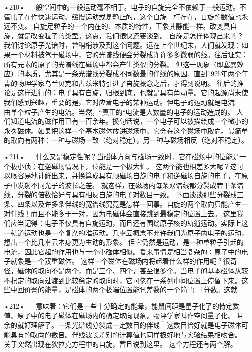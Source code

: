 •210•
  
般空间中的一般运动毫不相于。电子的自旋完全不依赖于一般运动。不管电子在作快速运动、缓慢运动或是静止的，这个自旋一杆存在，自旋的数值也永远不变。
自旋足粒子的一个内在的、本质的特性，正象其静能一样。改变具自旋，就是改变粒子的类型。这点，我们很快还要谈到。
自旋是怎样体现出来的？我们讨论原子光谙时，曾稍梢涉及到这个问题。远在上个世纪末，人们就发现：如果一个材料被驾于磁场中，它的光谱线便会分裂成许许多多微弱的线。往后证实：所有元素的原子的光谱线在磁场中都会产生类似的分裂。
但这一现象（即塞曼效应）的本质，尤其是一条光谱线分裂成不同数最的伴线的原因，直到1925年两个年青的物理学家乌兰贝克和古兹米特引进了自旋概念之后，才得到说明。
往后的推论是这样进行的：电子具有自旋，归根到底，也就是具有角动量。它的起源尚未使我们感到兴趣，重要的是，它对应着电子的某种运动。但电子的运动就是电流——由单个粒子产生的电流。当然，“真正的“电流是大数量的电子的运动造成的。
人们知道电流的磁作用已有一百余年。换句话说，一个电子可以被描绘成一个微小的永久磁体。如果把这样一个基本磁体放进磁场中，它会在这个磁场中取向。最简单的取向有两种：一种与磁场一致（绝对稳定），另一种与磁场相反（绝对不稳定）。

•211•
  
什么又是稳定性呢？当磁体方向与磁场一致时，它在磁炀中的位能是一个极小侦；在逆磁场情况下，位能是一个极大忙。
这两个能也相差多大呢？这可以哏容易地计鲜出来，并换算成具有顺磁场自旋的电子和逆磁场自旋的电子，在原子中发射不同光子的波长之差。
就这样，在磁场内每条双谱线都分裂成若干条谱线，分裂的倍数恰好与具有相反自旋的电子对数目一致。
下面谈谈那些分裂成三条、四条以及许多条伴线的宽谱线究竟是怎样一回事。自旋的两个取向只能产生一对伴线！而且不能多于一对，因为电磁体会直接跳到最稳定的位置上去。
这里我们应当记得：电子不仅具有自旋运动，而且还有围绕原子核的轨逍运动。实际上这一轨道运动也是一个复杂的准运动。几率云概念不允许我们为原子内电子的运动，想出一个比几率云本身更为生动的形象。
但它仍然是运动，是一种单粒子引起的电流，因此它起的作用也与一个小磁体相似。看来事情是相当复杂的：原子中的电子就象是一个双重磁体。
这样一个磁体在磁场内将起着什么样的作用呢？很奇怪，磁休的取向不是两个，而是三个、四个，甚至很多个。当电子的基本磁体从较不杞定的取向过渡到比较稳定的取向时，它可佬在一系列巾间位置上停留下来。这些中回价詈的能量，是磁体的两个极端位置能讯差数的一个简1'(_1分数。这就

•212•
  
意味着：它们是一些十分确定的能晕，能鼠间距是星子化了的特定数值。原子中的电子磁体在磁场内的确定取向现象，物评学家叫作空间量子化。
且余的就好理解了。一条光谱线分裂成一定数目的伴线｀这数目恰好就是电子磁体可能具有的取向的数目。伴线波长差别的计算值也同样极好地与实验结果相吻合。
关于突然出现在狄拉克方程中的自旋，暂且说到这里。
这个方程还有两个解。

